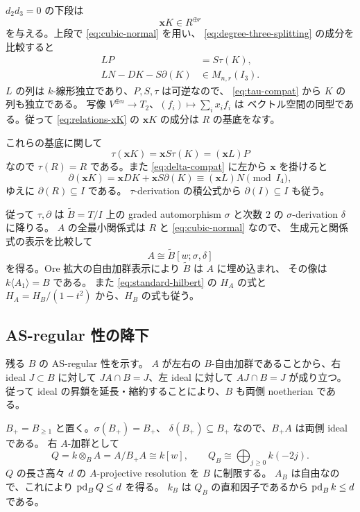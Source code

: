 \(d_2d_3=0\) の下段は
\begin{equation}\label{eq:relations-xK}
\mathbf xK\in R^{\oplus r}
\end{equation}
を与える。上段で \eqref{eq:cubic-normal} を用い、
\eqref{eq:degree-three-splitting} の成分を比較すると
\begin{align}
LP&=S\tau(K),\label{eq:tau-compat}\\
LN-DK-S\partial(K)&\in M_{n,r}(I_3).
\label{eq:delta-compat}
\end{align}
\(L\) の列は \(k\)-線形独立であり、\(P,S,\tau\) は可逆なので、
\eqref{eq:tau-compat} から \(K\) の列も独立である。
写像 \(V^{\oplus n}\to T_2\)、\((f_i)\mapsto\sum_i x_if_i\) は
ベクトル空間の同型である。従って \eqref{eq:relations-xK} の
\(\mathbf xK\) の成分は \(R\) の基底をなす。

これらの基底に関して
\[
\tau(\mathbf xK)=\mathbf xS\tau(K)=(\mathbf xL)P
\]
なので \(\tau(R)=R\) である。また \eqref{eq:delta-compat} に左から
\(\mathbf x\) を掛けると
\[
\partial(\mathbf xK)
=\mathbf xDK+\mathbf xS\partial(K)
\equiv(\mathbf xL)N\pmod{I_4},
\]
ゆえに \(\partial(R)\subseteq I\) である。
\(\tau\)-derivation の積公式から \(\partial(I)\subseteq I\) も従う。

従って \(\tau,\partial\) は \(\widetilde B=T/I\) 上の
graded automorphism \(\sigma\) と次数 \(2\) の
\(\sigma\)-derivation \(\delta\) に降りる。
\(A\) の全最小関係式は \(R\) と \eqref{eq:cubic-normal} なので、
生成元と関係式の表示を比較して
\begin{equation}\label{eq:ore-presentation}
A\cong \widetilde B[w;\sigma,\delta]
\end{equation}
を得る。Ore 拡大の自由加群表示により \(\widetilde B\) は \(A\) に埋め込まれ、
その像は \(k\langle A_1\rangle=B\) である。
また \eqref{eq:standard-hilbert} の \(H_A\) の式と
\(H_A=H_B/(1-t^2)\) から、\(H_B\) の式も従う。

\subsection{AS-regular 性の降下}\label{subsec:descent}

残る \(B\) の AS-regular 性を示す。
\(A\) が左右の \(B\)-自由加群であることから、右 ideal \(J\subset B\) に対して
\(JA\cap B=J\)、左 ideal に対して \(AJ\cap B=J\) が成り立つ。
従って ideal の昇鎖を延長・縮約することにより、\(B\) も両側 noetherian である。

\(B_+=B_{\ge1}\) と置く。\(\sigma(B_+)=B_+\)、
\(\delta(B_+)\subseteq B_+\) なので、\(B_+A\) は両側 ideal である。
右 \(A\)-加群として
\[
Q=k\otimes_BA=A/B_+A\cong k[w],
\qquad Q_B\cong\bigoplus_{j\ge0}k(-2j).
\]
\(Q\) の長さ高々 \(d\) の \(A\)-projective resolution を \(B\) に制限する。
\(A_B\) は自由なので、これにより \(\operatorname{pd}_BQ\le d\) を得る。
\(k_B\) は \(Q_B\) の直和因子であるから \(\operatorname{pd}_Bk\le d\) である。

